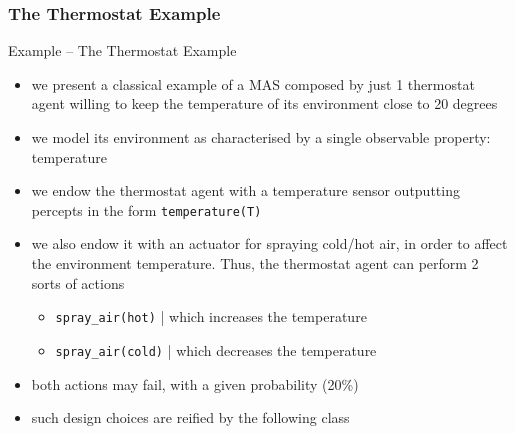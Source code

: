 \documentclass[presentation]{beamer}\mode<presentation>{\usetheme{AMSBolognaFC}}
\begin{document}
\subsubsection{The Thermostat Example}

\begin{frame}[c, allowframebreaks]{Example \theJasonExample{} -- The Thermostat Example}
\begin{itemize}
    
    \item we present a classical example of a MAS composed by just 1 thermostat agent willing to keep the temperature of its environment close to 20 degrees
    
    \vspace{.3cm}
    
    \item we model its environment as characterised by a single observable property: \alert{temperature}
    
    \vspace{.3cm}
    
    \item we endow the thermostat agent with a \alert{temperature sensor} outputting percepts in the form \alert{\texttt{temperature(T)}}
    
    \vspace{.3cm}
    
    \item we also endow it with an \alert{actuator} for \alert{spraying} cold/hot air, in order to affect the environment temperature.
    Thus, the thermostat agent can perform 2 sorts of actions
    \begin{itemize}
        \item \lstinline[language=Jason]{spray_air(hot)} | which increases the temperature
        \item \lstinline[language=Jason]{spray_air(cold)} | which decreases the temperature
    \end{itemize}
    
    \vspace{.3cm}
    
    \item both actions may fail, with a given probability (20\%)
    
    \framebreak
    
    \item such design choices are reified by the following class
    
    

\end{itemize}
\end{frame}
\end{document}
